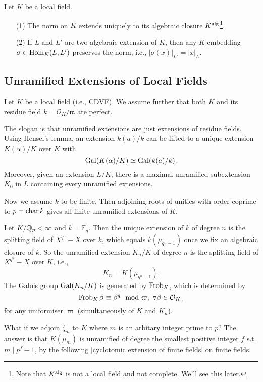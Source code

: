 \begin{corollary}
    Let $K$ be a local field.
    \begin{enumerate}
        \item [(1)]    The norm on $K$ extends uniquely to its algebraic closure $K^{\mathrm{alg}}$\footnote{Note that $K^{\mathrm{alg}}$ is not a local field and not complete. We'll see this later.}.
        \item [(2)] If $L$ and $L'$ are two algebraic extension of $K$,
        then any $K$-embedding $\sigma\in \operatorname{Hom}_K(L, L')$ preserves the norm; i.e., $|\sigma(x)|_{L'} = |x|_L$.
    \end{enumerate}
\end{corollary}

\subsection{Unramified Extensions of Local Fields}
Let $K$ be a local field (i.e., CDVF).
We assume further that both $K$ and its residue field $k = \mathcal{O}_K/\mathfrak{m}$ are perfect.

The slogan is that unramified extensions are just extensions of residue fields.
Using Hensel's lemma, an extension $k(a)/k$ can be lifted to a unique extension $K(\alpha)/K$ over $K$ with \[\operatorname{Gal}(K(\alpha)/K)\simeq \operatorname{Gal}(k(a)/k).\] Moreover, given an extension $L/K$, there is a maximal unramified subextension $K_0$ in $L$ containing every unramified extensions.

Now we assume $k$ to be finite. Then adjoining roots of unities with order coprime to $p = \operatorname{char} k$ gives all finite unramified extensions of $K$.

\begin{example}
    Let $K/\mathbb{Q}_p < \infty$ and $k = \mathbb{F}_q$.
    Then the unique extension of $k$ of degree $n$ is the splitting field of $X^{q^n} - X$ over $k$, which equals $k(\mu_{q^n - 1})$ once we fix an algebraic closure of $k$.
    So the unramified extension $K_n/K$ of degree $n$ is the splitting field of $X^{q^n} - X$ over $K$, i.e., \[K_n = K(\mu_{q^{n} - 1}).\] The Galois group $\operatorname{Gal}(K_n/K)$ is generated by $\operatorname{Frob}_K$, which is determined by \[\operatorname{Frob}_K\beta \equiv \beta^q \mod\varpi,\ \forall\beta\in\mathcal{O}_{K_n}\]for any uniformiser $\varpi$ (simultaneously of $K$ and $K_n$).

    What if we adjoin $\zeta_{m}$ to $K$ where $m$ is an arbitary integer prime to $p$?
    The answer is that $K(\mu_m)$ is unramified of degree the smallest positive integer $f$ s.t. $m \mid p^f - 1$, by the following \cref{cyclotomic extension of finite fields} on finite fields.
\end{example}

